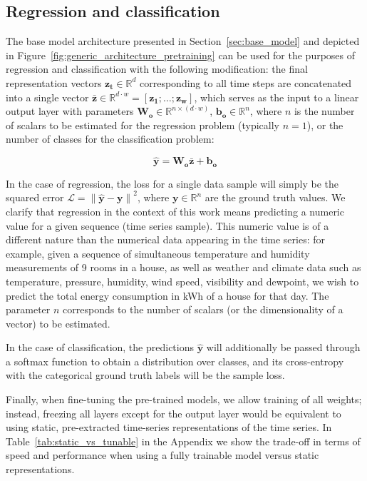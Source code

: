 \documentclass{article} \usepackage{iclr2021_conference,times}
\begin{document}
\subsection{Regression and classification}

The base model architecture presented in Section~\ref{sec:base_model} and depicted in Figure~\ref{fig:generic_architecture_pretraining} can be used for the purposes of regression and classification with the following modification: the final representation vectors $\mathbf{z_t} \in \mathbb{R}^{d}$ corresponding to all time steps are concatenated into a single vector $\bar{\textbf{z}} \in \mathbb{R}^{d\cdot w} = [\mathbf{z_1}; \dots; \mathbf{z_w}]$, which serves as the input to a linear output layer with parameters $\mathbf{W_o} \in \mathbb{R}^{n\times (d\cdot w)}$, $\mathbf{b_o}  \in \mathbb{R}^{n}$, where $n$ is the number of scalars to be estimated for the regression problem (typically $n=1$), or the number of classes for the classification problem:

\begin{equation}
\mathbf{\hat{y}} = \mathbf{W_o}\bar{\textbf{z}} + \mathbf{b_o} \label{eq:reg_prediction}
\end{equation}

In the case of regression, the loss for a single data sample will simply be the squared error $\mathcal{L}= \left \| \mathbf{\hat{y}} - \mathbf{y} \right \|^2$, where $\mathbf{y} \in \mathbb{R}^{n}$ are the ground truth values. We clarify that regression in the context of this work means predicting a numeric value for a given sequence (time series sample). This numeric value is of a different nature than the numerical data appearing in the time series: for example, given a sequence of simultaneous temperature and humidity measurements of 9 rooms in a house, as well as weather and climate data such as temperature, pressure, humidity, wind speed, visibility and dewpoint, we wish to predict the total energy consumption in kWh of a house for that day. The parameter $n$ corresponds to the number of scalars (or the dimensionality of a vector) to be estimated.

In the case of classification, the predictions $\mathbf{\hat{y}}$ will additionally be passed through a softmax function to obtain a distribution over classes, and its cross-entropy with the categorical ground truth labels will be the sample loss.

Finally, when fine-tuning the pre-trained models, we allow training of all weights; instead, freezing all layers except for the output layer would be equivalent to using static, pre-extracted time-series representations of the time series. In Table~\ref{tab:static_vs_tunable} in the Appendix we show the trade-off in terms of speed and performance when using a fully trainable model versus static representations.
\end{document}
